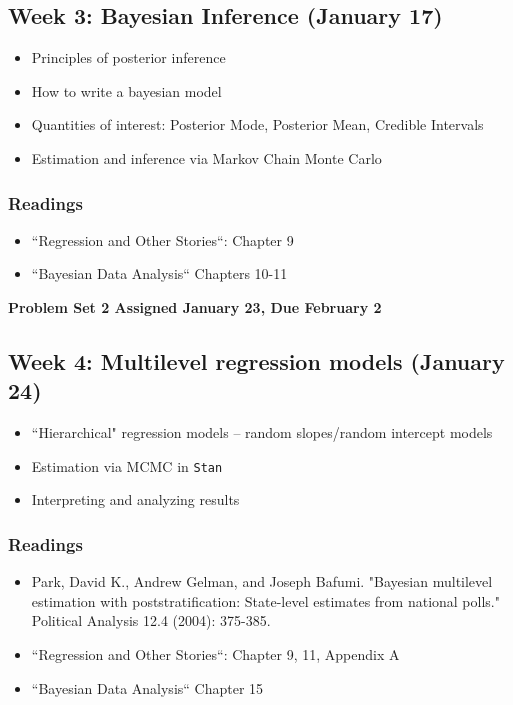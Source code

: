 \documentclass[11pt, article, oneside]{memoir}
\theoremstyle{Assumption}
\begin{document}
\subsection{Week 3: Bayesian Inference (January 17)}

\begin{itemize}
\item Principles of posterior inference
\item How to write a bayesian model
\item Quantities of interest: Posterior Mode, Posterior Mean, Credible Intervals
\item Estimation and inference via Markov Chain Monte Carlo
\end{itemize}

\subsubsection*{Readings}

\begin{itemize}
\item ``Regression and Other Stories``: Chapter 9
\item ``Bayesian Data Analysis`` Chapters 10-11
\end{itemize}


\textbf{Problem Set 2 Assigned January 23, Due February 2}

\subsection{Week 4: Multilevel regression models (January 24)}

\begin{itemize}
\item ``Hierarchical" regression models -- random slopes/random intercept models
\item Estimation via MCMC in \texttt{Stan}
\item Interpreting and analyzing results
\end{itemize}

\subsubsection*{Readings}

\begin{itemize}
\item Park, David K., Andrew Gelman, and Joseph Bafumi. "Bayesian multilevel estimation with poststratification: State-level estimates from national polls." Political Analysis 12.4 (2004): 375-385.
\item ``Regression and Other Stories``: Chapter 9, 11, Appendix A
\item ``Bayesian Data Analysis`` Chapter 15
\end{itemize}
\end{document}
